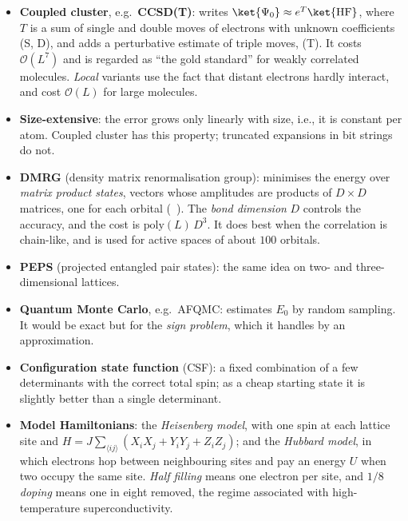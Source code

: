 \documentclass[handoutsbeamer.tex]{subfiles}
\begin{document}
\begin{frame}
\onp{\scriptsize}
\begin{itemize}\setlength\itemsep{0.15em}
    \item \textbf{Coupled cluster}, e.g.\ \textbf{CCSD(T)}: writes $\ket{\Psi_0} \approx e^{T}\ket{\rm HF}$, where $T$ is a sum of single and double moves of electrons with unknown coefficients (S, D), and adds a perturbative estimate of triple moves, (T). It costs $\mathcal O(L^7)$ and is regarded as ``the gold standard'' for weakly correlated molecules. \emph{Local} variants use the fact that distant electrons hardly interact, and cost $\mathcal O(L)$ for large molecules.
    \item \textbf{Size-extensive}: the error grows only linearly with size, i.e., it is constant per atom. Coupled cluster has this property; truncated expansions in bit strings do not.
    \item \textbf{DMRG} (density matrix renormalisation group): minimises the energy over \emph{matrix product states}, vectors whose amplitudes are products of $D\times D$ matrices, one for each orbital (\Chap~). The \emph{bond dimension} $D$ controls the accuracy, and the cost is $\mathrm{poly}(L)\,D^3$. It does best when the correlation is chain-like, and is used for active spaces of about $100$ orbitals.
    \item \textbf{PEPS} (projected entangled pair states): the same idea on two- and three-dimensional lattices.
    \item \textbf{Quantum Monte Carlo}, e.g.\ AFQMC: estimates $E_0$ by random sampling. It would be exact but for the \emph{sign problem}, which it handles by an approximation.
    \item \textbf{Configuration state function} (CSF): a fixed combination of a few determinants with the correct total spin; as a cheap starting state it is slightly better than a single determinant.
    \item \textbf{Model Hamiltonians}: the \emph{Heisenberg model}, with one spin at each lattice site and $H = J\sum_{\langle ij\rangle}(X_iX_j + Y_iY_j + Z_iZ_j)$; and the \emph{Hubbard model}, in which electrons hop between neighbouring sites and pay an energy $U$ when two occupy the same site. \emph{Half filling} means one electron per site, and \emph{$1/8$ doping} means one in eight removed, the regime associated with high-temperature superconductivity.
\end{itemize}
\end{frame}
\end{document}
